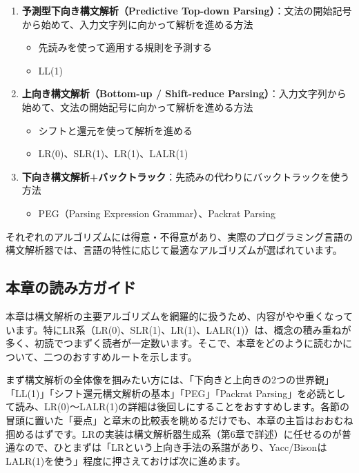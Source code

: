 \begin{enumerate}
\def\labelenumi{\arabic{enumi}.}
\tightlist
\item
  \textbf{予測型下向き構文解析（Predictive Top-down
  Parsing）}：文法の開始記号から始めて、入力文字列に向かって解析を進める方法

  \begin{itemize}
  \tightlist
  \item
    先読みを使って適用する規則を予測する
  \item
    LL(1)
  \end{itemize}
\item
  \textbf{上向き構文解析（Bottom-up / Shift-reduce
  Parsing）}：入力文字列から始めて、文法の開始記号に向かって解析を進める方法

  \begin{itemize}
  \tightlist
  \item
    シフトと還元を使って解析を進める
  \item
    LR(0)、SLR(1)、LR(1)、LALR(1)
  \end{itemize}
\item
  \textbf{下向き構文解析+バックトラック}：先読みの代わりにバックトラックを使う方法

  \begin{itemize}
  \tightlist
  \item
    PEG（Parsing Expression Grammar）、Packrat Parsing
  \end{itemize}
\end{enumerate}

それぞれのアルゴリズムには得意・不得意があり、実際のプログラミング言語の構文解析器では、言語の特性に応じて最適なアルゴリズムが選ばれています。

\hypertarget{chapter5-ux672cux7ae0ux306eux8aadux307fux65b9ux30acux30a4ux30c9}{%
\subsection{本章の読み方ガイド}\label{chapter5-ux672cux7ae0ux306eux8aadux307fux65b9ux30acux30a4ux30c9}}

本章は構文解析の主要アルゴリズムを網羅的に扱うため、内容がやや重くなっています。特にLR系（LR(0)、SLR(1)、LR(1)、LALR(1)）は、概念の積み重ねが多く、初読でつまずく読者が一定数います。そこで、本章をどのように読むかについて、二つのおすすめルートを示します。

まず構文解析の全体像を掴みたい方には、「下向きと上向きの2つの世界観」「LL(1)」「シフト還元構文解析の基本」「PEG」「Packrat Parsing」を必読として読み、LR(0)〜LALR(1)の詳細は後回しにすることをおすすめします。各節の冒頭に置いた「要点」と章末の比較表を眺めるだけでも、本章の主旨はおおむね掴めるはずです。LRの実装は構文解析器生成系（第6章で詳述）に任せるのが普通なので、ひとまずは「LRという上向き手法の系譜があり、Yacc/BisonはLALR(1)を使う」程度に押さえておけば次に進めます。

